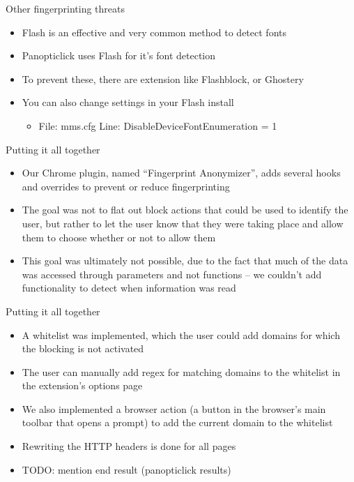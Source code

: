 \begin{frame}[fragile,t]{Other fingerprinting threats}
	\begin{itemize}
		\item Flash is an effective and very common method to detect fonts
		\item Panopticlick uses Flash for it's font detection
		\item To prevent these, there are extension like Flashblock, or Ghostery
		\item You can also change settings in your Flash install
		\begin{itemize}
			\item File: mms.cfg Line: DisableDeviceFontEnumeration = 1
		\end{itemize}
	\end{itemize}
\end{frame}

\begin{frame}[fragile,t]{Putting it all together}
	\begin{itemize}
		\item Our Chrome plugin, named ``Fingerprint Anonymizer'', adds several hooks and overrides to prevent or reduce fingerprinting
		\item The goal was not to flat out block actions that could be used to identify the user, but rather to let the user know that they were taking place and allow them to choose whether or not to allow them
		\item This goal was ultimately not possible, due to the fact that much of the data was accessed through parameters and not functions -- we couldn't add functionality to detect when information was read
	\end{itemize}
\end{frame}

\begin{frame}[fragile,t]{Putting it all together}
	\begin{itemize}
		\item A whitelist was implemented, which the user could add domains for which the blocking is not activated
		\item The user can manually add regex for matching domains to the whitelist in the extension's options page
		\item We also implemented a browser action (a button in the browser's main toolbar that opens a prompt) to add the current domain to the whitelist
		\item Rewriting the HTTP headers is done for all pages
		\item TODO: mention end result (panopticlick results)
	\end{itemize}
\end{frame}

